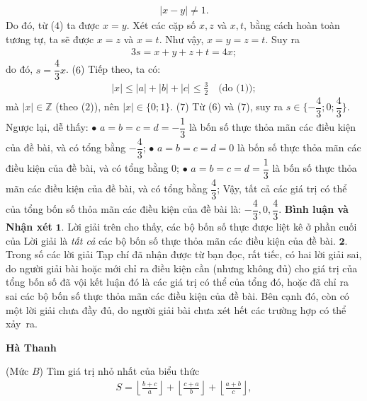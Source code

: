 \begin{multicols}{2}
	\begin{align*}
		|x - y| \ne 1.
	\end{align*}
	Do đó, từ ($4$) ta được $x = y$.
	\vskip 0.05cm
	Xét các cặp số $x, z$ và $x, t$, bằng cách hoàn toàn tương tự, ta sẽ được $x = z$ và $x = t$.
	\vskip 0.05cm
	Như vậy, $x = y = z = t$. Suy ra
	\begin{align*}
		3s = x  + y + z + t = 4x;
	\end{align*}
	do đó, $s = \dfrac{4}{3}x$. \hfill ($6$)
	\vskip 0.05cm
	Tiếp theo, ta có:
	\begin{align*}
		|x| \le |a| + |b| + |c| \le \frac{3}{2} \quad\text{(do ($1$))}; 
	\end{align*}
	mà $|x| \in \mathbb{Z}$  (theo ($2$)), nên  $|x| \in \{0;1\}$. \hfill ($7$)
	\vskip 0.05cm
	Từ ($6$) và ($7$), suy ra $s \in \{-\dfrac{4}{3}; 0; \dfrac{4}{3}\}$.
	\vskip 0.05cm 
	Ngược lại, dễ thấy:
	\vskip 0.05cm
	$\bullet$ $a=b=c=d = -\dfrac{1}{3}$   là bốn số thực thỏa mãn các điều kiện của đề bài, và có tổng bằng $- \dfrac{4}{3}$;
	\vskip 0.05cm  
	$\bullet$  $a=b=c=d = 0$  là bốn số thực thỏa mãn các điều kiện của đề bài, và có tổng bằng $0$;
	\vskip 0.05cm
	$\bullet$ $a=b=c=d = \dfrac{1}{3}$   là bốn số thực thỏa mãn các điều kiện của đề bài, và có tổng bằng $\dfrac{4}{3}$;
	\vskip 0.05cm  
	Vậy, tất cả các giá trị có thể của tổng bốn số thỏa mãn các điều kiện của đề bài là:  $- \dfrac{4}{3}, 0, \dfrac{4}{3}$.
	\vskip 0.05cm  
	\textbf{\color{thachthuctoanhoc}Bình luận và Nhận xét}
	\vskip 0.05cm
	$\pmb{1.}$ Lời giải trên cho thấy, các bộ bốn số thực được liệt kê ở phần cuối của Lời giải là \textit{tất cả} các bộ bốn số thực thỏa mãn các điều kiện của đề bài.
	\vskip 0.05cm
	$\pmb{2.}$ Trong số các lời giải Tạp chí đã nhận được từ bạn đọc, rất tiếc, có hai lời giải sai, do người giải bài hoặc mới chỉ ra điều kiện cần (nhưng không đủ) cho giá trị của tổng bốn số đã vội kết luận đó là các giá trị có thể của tổng đó, hoặc đã chỉ ra sai các bộ bốn số thực thỏa mãn các điều kiện của đề bài. Bên cạnh đó, còn có một lời giải chưa đầy đủ, do người giải bài chưa xét hết các trường hợp có thể xảy~ra.
	\begin{flushright}
		\textbf{\color{thachthuctoanhoc}Hà Thanh}
	\end{flushright}
	{}
	(Mức $B$)
	Tìm giá trị nhỏ nhất của biểu thức
	\begin{align*}
		S = \left\lfloor {\frac{{b + c}}{a}} \right\rfloor  + \left\lfloor {\frac{{c + a}}{b}} \right\rfloor  + \left\lfloor {\frac{{a + b}}{c}} \right\rfloor ,

\end{align*}
\end{multicols}
